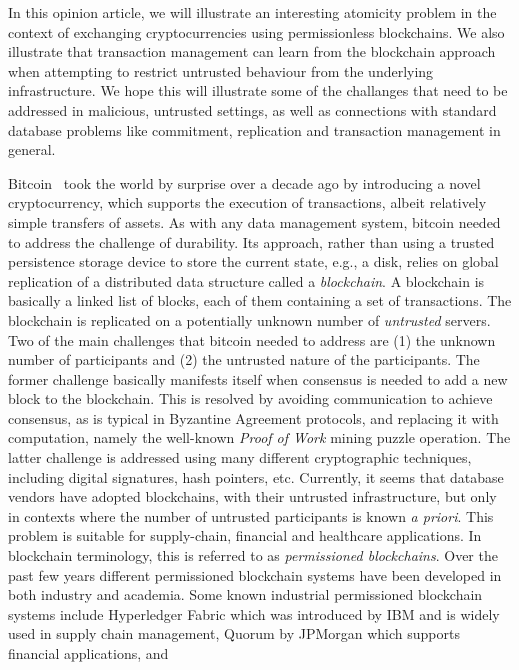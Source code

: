 \documentclass[11pt]{article}
\begin{document}
In this opinion article, we will illustrate an interesting atomicity problem in the context of exchanging cryptocurrencies using permissionless blockchains. We also illustrate that transaction management can learn from the blockchain approach when attempting to restrict untrusted behaviour from the underlying infrastructure.  We hope this will illustrate some of the challanges that need to be addressed in malicious, untrusted settings, as well as connections with standard database problems like commitment, replication and transaction management in general. 

Bitcoin~\cite{nakamoto2008bitcoin} took the world by surprise over a decade ago by introducing a novel cryptocurrency, which supports the execution of transactions, albeit relatively simple transfers of assets.  As with any data management system, bitcoin needed to address the challenge of durability.  Its approach, rather than using a trusted persistence storage device to store the current state, e.g., a disk, relies on global replication of a distributed data structure called a {\em blockchain}.  A blockchain is basically a linked list of blocks, each of them containing a set of transactions.  The blockchain is replicated on a potentially unknown number of {\em untrusted} servers.
Two of the main challenges that bitcoin needed to address are (1) the unknown number of participants and (2) the untrusted nature of the participants.  The former challenge basically manifests itself when consensus is needed to add a new block to the blockchain.  This is resolved by avoiding communication to achieve consensus, as is typical in Byzantine Agreement protocols, and replacing it with computation, namely the well-known {\em Proof of Work} mining puzzle operation.  The latter challenge is addressed using many different cryptographic techniques, including digital signatures, hash pointers, etc.  Currently, it seems that database vendors have adopted blockchains, with their untrusted infrastructure, but only in contexts where the number of untrusted participants is known {\em a priori}.  This problem is suitable for supply-chain, financial and healthcare applications. In blockchain terminology, this is referred to as {\em permissioned blockchains}.  Over the past few years different permissioned blockchain systems have been developed in both
industry and academia.
Some known industrial permissioned blockchain systems include Hyperledger Fabric \cite{androulaki2018hyperledger} which was introduced by IBM and is widely used in supply chain management,
Quorum \cite{morgan2016quorum} by JPMorgan which supports financial applications, and
\end{document}
